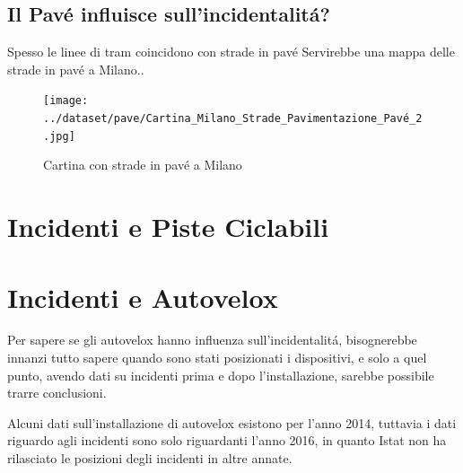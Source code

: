\documentclass[a4paper]{report}
\begin{document}

\clearpage
\subsection{Il Pav\'e influisce sull'incidentalit\'a?}
Spesso le linee di tram coincidono con strade in pav\'e
Servirebbe una mappa delle strade in pav\'e a Milano..

\begin{figure}[!ht]
    \texttt{[image: ../dataset/pave/Cartina\_Milano\_Strade\_Pavimentazione\_Pavé\_2.jpg]}
    \caption{Cartina con strade in pav\'e a Milano}
    \label{fig:pave_milano}
\end{figure}


\clearpage
\section{Incidenti e Piste  Ciclabili}

\clearpage
\section{Incidenti e Autovelox}

Per sapere se gli autovelox hanno influenza sull'incidentalit\'a, 
bisognerebbe innanzi tutto sapere quando sono stati posizionati i dispositivi, e solo a quel punto, 
avendo dati su incidenti prima e dopo l'installazione, sarebbe possibile trarre conclusioni.

Alcuni dati sull'installazione di autovelox esistono per l'anno 2014, tuttavia i dati 
riguardo agli incidenti sono solo riguardanti l'anno 2016, in quanto Istat non ha rilasciato 
le posizioni degli incidenti in altre annate.

\end{document}

